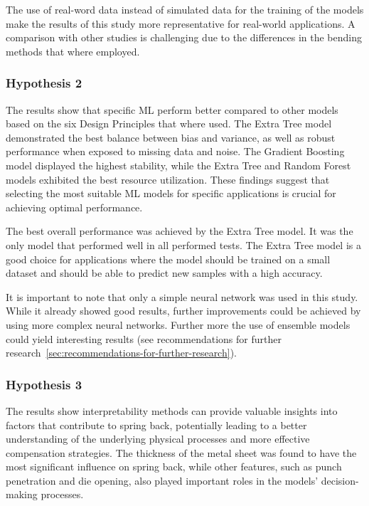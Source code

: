The use of real-word data instead of simulated data for the training of the models make the results of this study more
representative for real-world applications.
A comparison with other studies is challenging due to the differences in the bending methods that where employed.

\subsubsection{Hypothesis 2}

The results show that specific \ac{ML} perform better compared to other models based on the six Design Principles
that where used.
The Extra Tree model demonstrated the best balance between bias and variance, as well as robust performance when
exposed to missing data and noise.
The Gradient Boosting model displayed the highest stability, while the Extra Tree and Random Forest models exhibited
the best resource utilization.
These findings suggest that selecting the most suitable ML models for specific applications is crucial for achieving
optimal performance.

The best overall performance was achieved by the Extra Tree model.
It was the only model that performed well in all performed tests.
The Extra Tree model is a good choice for applications where the model should be trained on a small dataset and
should be able to predict new samples with a high accuracy.

It is important to note that only a simple neural network was used in this study.
While it already showed good results, further improvements could be achieved by using more complex neural networks.
Further more the use of ensemble models could yield interesting results (see recommendations for further
research~\ref{sec:recommendations-for-further-research}).

\subsubsection{Hypothesis 3}
The results show interpretability methods can provide valuable insights into factors that contribute to spring back,
potentially leading to a better understanding of the underlying physical processes and more effective compensation
strategies.
The thickness of the metal sheet was found to have the most significant influence on spring back, while other
features, such as punch penetration and die opening, also played important roles in the models' decision-making
processes.

